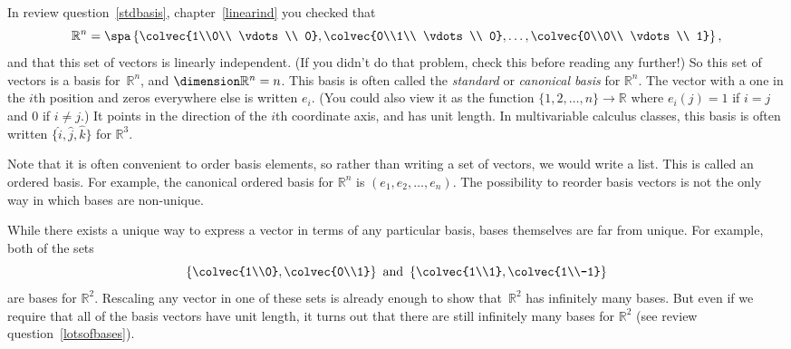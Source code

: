 In review question~\ref{stdbasis}, chapter~\ref{linearind} you checked that
\[
\mathbb{R}^n = \spa \left\{ \colvec{1\\0\\ \vdots \\ 0}, 
\colvec{0\\1\\ \vdots \\ 0}, \ldots, \colvec{0\\0\\ \vdots \\ 1}\right\},
\]
and that this set of vectors is linearly independent. (If you didn't do that problem, check this before reading any further!)  So this set of vectors is a basis for~$\mathbb{R}^n$, and $\dimension \mathbb{R}^n=n$.  This basis is often called the \emph{standard} or \emph{canonical basis} for $\mathbb{R}^n$.  The vector with a one in the $i$th position and zeros everywhere else is written 
$e_i$. (You could also view it as the function $\{1,2,\ldots,n\}\to {\mathbb R}$ where $e_i(j)=1$ if $i=j$ and $0$ if $i\neq j$.)  It points in the direction of the $i$th coordinate axis, and has unit length.  In multivariable calculus classes, this basis is often written $\{ \hat i,\hat j,\hat k \}$ for $\mathbb{R}^3$. 


Note that it is often convenient to order  basis elements, so rather than writing a set
of vectors, we would write a list. This is called an ordered basis. For example, the canonical ordered basis for ${\mathbb R^n}$ is $(e_1,e_2,\ldots,e_n)$. The possibility to reorder basis vectors is not the only way in which bases are non-unique.

\begin{remark}
While there exists a unique way to express a vector in terms of any particular basis, bases themselves are far from unique.
For example, both of the sets 
\[
\left\{ \colvec{1\\0}, \colvec{0\\1} \right\} \text{ and }
\left\{ \colvec{1\\1}, \colvec{1\\-1} \right\}
\]
are bases for $\mathbb{R}^2$.  Rescaling any vector in one of these sets is already enough to show that~$\mathbb{R}^2$ has infinitely many bases.  But even if we require that all of the basis vectors have unit length, it turns out that there are still infinitely many bases for $\mathbb{R}^2$ (see review question~\ref{lotsofbases}).
\end{remark}


